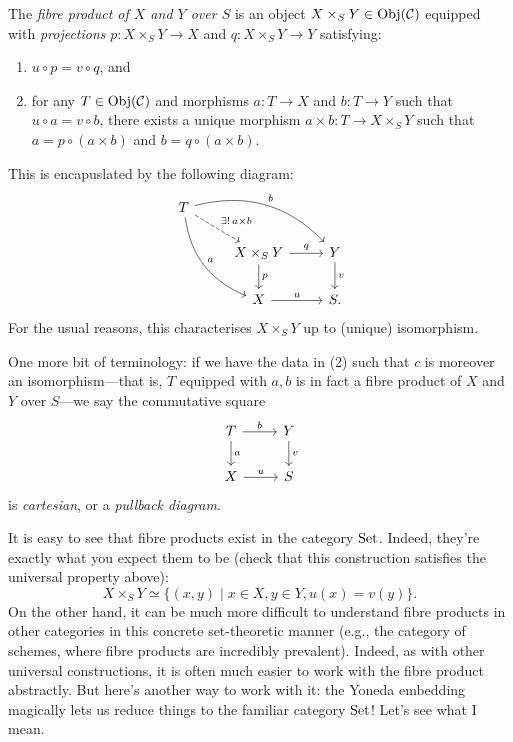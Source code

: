 \begin{definition}
The \textit{fibre product of $X$ and $Y$ over $S$} is an object $X
\times_S Y \in \operatorname{Obj}(\mathcal{C})$ equipped with \textit{projections} $p : X
\times_S Y \to X$ and $q : X \times_S Y \to Y$ satisfying:
\begin{enumerate}
\item $u \circ p = v \circ q$, and
\item for any $T \in \operatorname{Obj}(\mathcal{C})$ and morphisms $a : T \to X$ and $b : T
  \to Y$ such that $u \circ a = v \circ b$, there exists a unique
  morphism $a \times b : T \to X \times_S Y$ such that $a = p \circ (a
  \times b)$ and $b = q \circ (a \times b)$.
\end{enumerate}
This is encapuslated by the following diagram:
\[
\begin{tikzcd}
  T \ar[bend left]{rrd}{b} \ar[bend right]{ddr}{a}
  \ar[dashed]{dr}{\exists!\, a \times b} & & \\ & X \times_S Y \rar{q}
  \dar{p} & Y \dar{v} \\ & X \rar{u} & S.
\end{tikzcd}
\]
For the usual reasons, this characterises $X \times_S Y$ up to
(unique) isomorphism.

One more bit of terminology: if we have the data in (2) such that $c$
is moreover an isomorphism---that is, $T$ equipped with $a,b$ is in
fact a fibre product of $X$ and $Y$ over $S$---we say the commutative
square
\[
\begin{tikzcd}
  T \rar{b} \dar{a} & Y \dar{v} \\ X \rar{u} & S
\end{tikzcd}
\]
is \textit{cartesian}, or a \textit{pullback diagram}.
\end{definition}

\begin{example}
  It is easy to see that fibre products exist in the category
  $\mathrm{Set}$. Indeed, they're exactly what you expect them to be (check
  that this construction satisfies the universal property above):
  \[
  X \times_S Y \simeq \{(x, y) \mid x \in X, y \in Y, u(x) = v(y)\}.
  \]
  On the other hand, it can be much more difficult to understand fibre
  products in other categories in this concrete set-theoretic manner
  (e.g., the category of schemes, where fibre products are incredibly
  prevalent). Indeed, as with other universal constructions, it is
  often much easier to work with the fibre product abstractly. But
  here's another way to work with it: the Yoneda embedding magically
  lets us reduce things to the familiar category $\mathrm{Set}$!  Let's see
  what I mean.
\end{example}


